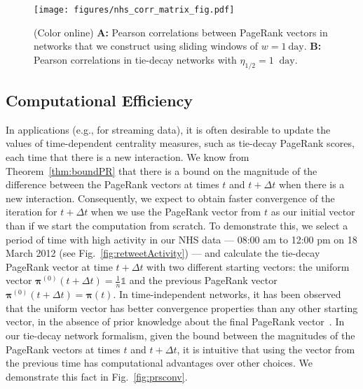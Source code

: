 \documentclass[journal,transmag]{IEEEtran}
\newcommand{\gvec}[1]{\bm{#1}}
\newcommand{\tdt}{t+\Delta t}
\newcommand{\vpi}{\gvec{\pi}}
\begin{document}
\begin{figure}[tp]
  \centering
  \texttt{[image: figures/nhs\_corr\_matrix\_fig.pdf]}
  \caption{(Color online) {\bf A:} Pearson
    correlations between PageRank vectors in networks that we
    construct using sliding windows of $w=1~\text{day}$. 
    {\bf B:} Pearson correlations in tie-decay
	networks with $\eta_{1/2} = 1~\text{ day}$. 
    }
  \label{fig:NHSCorrMatrices}
\end{figure}

 
\subsection{Computational Efficiency}
\label{sec:efficiency}

In applications (e.g., for streaming data), it is often desirable to
update the values of time-dependent centrality measures, such as
tie-decay PageRank scores, each time that there is a new interaction. We know
from Theorem~\ref{thm:boundPR} that there is a bound on the magnitude
of the difference between the PageRank vectors at times $t$ and $\tdt$
when there is a new interaction. Consequently, we expect to obtain
faster convergence of the iteration for $\tdt$ when we use the
PageRank vector from $t$ as our initial vector than if we start the computation from scratch. 
To demonstrate this, we select a period of time with high activity in our NHS data ---
08:00 am to 12:00 pm on 18 March 2012 (see
Fig.~\ref{fig:retweetActivity}) --- and calculate the tie-decay
PageRank vector at time $\tdt$ with two different starting vectors:
the uniform vector $\vpi^{\left(0\right)}(\tdt)=\frac{1}{n}\mathbb{1}$ and the previous
PageRank vector $\vpi^{\left(0\right)}(\tdt)=\vpi(t)$. In
time-independent networks, it has been observed that the uniform
vector has better convergence properties than any other starting
vector, in the absence of prior knowledge about the final PageRank
vector~\cite{Gleich2015}. In our tie-decay network formalism, given
the bound between the magnitudes of the PageRank vectors at times $t$ and $\tdt$, it
is intuitive that using the vector from the previous time has
computational advantages over other choices. We demonstrate this fact
in Fig.~\ref{fig:prsconv}.
\end{document}

